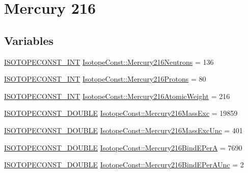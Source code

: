 \hypertarget{group___isotope_const-_mercury-_hg216}{}\section{Mercury 216}
\label{group___isotope_const-_mercury-_hg216}
\subsection*{Variables}
\begin{DoxyCompactItemize}
\item 
\mbox{\hyperlink{group___isotope_const-_macros_ga5f18360b3e99483a35c32d789e62621c}{I\+S\+O\+T\+O\+P\+E\+C\+O\+N\+S\+T\+\_\+\+I\+NT}} \mbox{\hyperlink{group___isotope_const-_mercury-_hg216_ga832d7b9e6b2dd3e7ba93e77bca46995b}{Isotope\+Const\+::\+Mercury216\+Neutrons}} = 136
\item 
\mbox{\hyperlink{group___isotope_const-_macros_ga5f18360b3e99483a35c32d789e62621c}{I\+S\+O\+T\+O\+P\+E\+C\+O\+N\+S\+T\+\_\+\+I\+NT}} \mbox{\hyperlink{group___isotope_const-_mercury-_hg216_gaa2897f9066bbe835388ce1964ce550ed}{Isotope\+Const\+::\+Mercury216\+Protons}} = 80
\item 
\mbox{\hyperlink{group___isotope_const-_macros_ga5f18360b3e99483a35c32d789e62621c}{I\+S\+O\+T\+O\+P\+E\+C\+O\+N\+S\+T\+\_\+\+I\+NT}} \mbox{\hyperlink{group___isotope_const-_mercury-_hg216_gadc575d2984773bc4e0461b7fd59019aa}{Isotope\+Const\+::\+Mercury216\+Atomic\+Weight}} = 216
\item 
\mbox{\hyperlink{group___isotope_const-_macros_ga8f45a7272ce02c0b4c65c44636ed719a}{I\+S\+O\+T\+O\+P\+E\+C\+O\+N\+S\+T\+\_\+\+D\+O\+U\+B\+LE}} \mbox{\hyperlink{group___isotope_const-_mercury-_hg216_ga2f19ba890c9dc6efe0f838d891a76984}{Isotope\+Const\+::\+Mercury216\+Mass\+Exc}} = 19859
\item 
\mbox{\hyperlink{group___isotope_const-_macros_ga8f45a7272ce02c0b4c65c44636ed719a}{I\+S\+O\+T\+O\+P\+E\+C\+O\+N\+S\+T\+\_\+\+D\+O\+U\+B\+LE}} \mbox{\hyperlink{group___isotope_const-_mercury-_hg216_gaa339c355c151bf8f8e4bd25b4c59d7f2}{Isotope\+Const\+::\+Mercury216\+Mass\+Exc\+Unc}} = 401
\item 
\mbox{\hyperlink{group___isotope_const-_macros_ga8f45a7272ce02c0b4c65c44636ed719a}{I\+S\+O\+T\+O\+P\+E\+C\+O\+N\+S\+T\+\_\+\+D\+O\+U\+B\+LE}} \mbox{\hyperlink{group___isotope_const-_mercury-_hg216_gac78a547b6cf01c55464b23e770280ac4}{Isotope\+Const\+::\+Mercury216\+Bind\+E\+PerA}} = 7690
\item 
\mbox{\hyperlink{group___isotope_const-_macros_ga8f45a7272ce02c0b4c65c44636ed719a}{I\+S\+O\+T\+O\+P\+E\+C\+O\+N\+S\+T\+\_\+\+D\+O\+U\+B\+LE}} \mbox{\hyperlink{group___isotope_const-_mercury-_hg216_gac63c207442b63f5a7923c484496dd302}{Isotope\+Const\+::\+Mercury216\+Bind\+E\+Per\+A\+Unc}} = 2

\end{DoxyCompactItemize}
